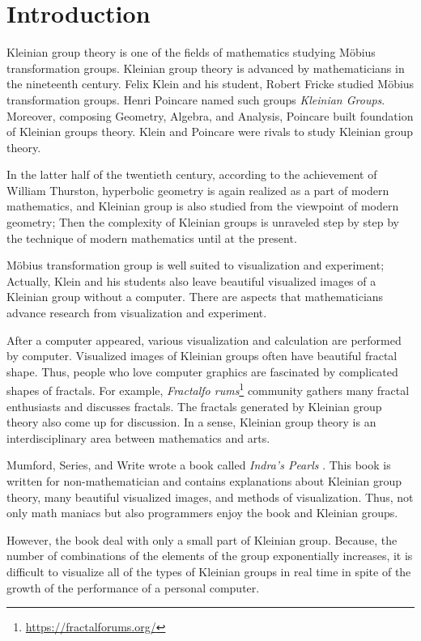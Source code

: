 
\section{Introduction}

Kleinian group theory is one of the fields of mathematics studying 
M\"obius transformation groups.
Kleinian group theory is advanced by mathematicians in the nineteenth
century.
Felix Klein and his student, Robert Fricke studied M\"obius
transformation groups.
Henri Poincare named such groups \textit{Kleinian Groups}.
Moreover, composing Geometry, Algebra, and Analysis,
Poincare built foundation of Kleinian groups theory.
Klein and Poincare were rivals to study Kleinian group theory.

In the latter half of the twentieth century, according to the achievement of William
Thurston, hyperbolic geometry is again realized as a part of modern
mathematics, and Kleinian group is also studied from the viewpoint of
modern geometry;
Then the complexity of Kleinian groups is unraveled step by step by
the technique of modern mathematics until at the present.

M\"obius transformation group is well suited to visualization and
experiment; Actually, Klein and his students also leave beautiful
visualized images of a Kleinian group without a computer.
There are aspects that mathematicians advance research from
visualization and experiment.

After a computer appeared, various visualization and calculation are
performed by computer.
Visualized images of Kleinian groups often have beautiful fractal shape.
Thus, people who love computer graphics are fascinated by complicated shapes of fractals.
For example,
\textit{Fractalfo rums}\footnote{\url{https://fractalforums.org/}}
community gathers many fractal enthusiasts and discusses fractals.
The fractals generated by Kleinian group theory also come up for
discussion.
In a sense, Kleinian group theory is an interdisciplinary area between
mathematics and arts.

Mumford, Series, and Write wrote a book called
\textit{Indra's Pearls} \cite{MumfordSeriesWright200204}.
This book is written for non-mathematician and contains explanations
about Kleinian group theory, many beautiful visualized images, and
methods of visualization.
Thus, not only math maniacs but also programmers enjoy the book and
Kleinian groups.

However, the book deal with only a small part of Kleinian group.
Because, the number of combinations of the elements of the group
exponentially increases, it is difficult to
visualize all of the types of Kleinian groups in real time
in spite of the growth of the performance of a personal computer.

